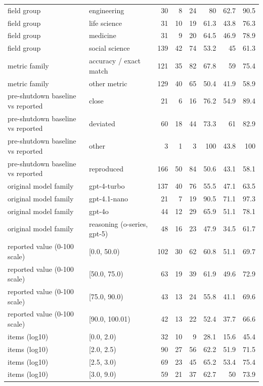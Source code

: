 \begin{longtable}{>{\raggedright\arraybackslash}p{20mm}>{\raggedright\arraybackslash}p{28mm}rrrrrr}
field group & engineering & 30 & 8 & 24 & 80 & 62.7 & 90.5 \\
field group & life science & 31 & 10 & 19 & 61.3 & 43.8 & 76.3 \\
field group & medicine & 31 & 9 & 20 & 64.5 & 46.9 & 78.9 \\
field group & social science & 139 & 42 & 74 & 53.2 & 45 & 61.3 \\
metric family & accuracy /\allowbreak{} exact match & 121 & 35 & 82 & 67.8 & 59 & 75.4 \\
metric family & other metric & 129 & 40 & 65 & 50.4 & 41.9 & 58.9 \\
pre-\allowbreak{}shutdown baseline vs reported & close & 21 & 6 & 16 & 76.2 & 54.9 & 89.4 \\
pre-\allowbreak{}shutdown baseline vs reported & deviated & 60 & 18 & 44 & 73.3 & 61 & 82.9 \\
pre-\allowbreak{}shutdown baseline vs reported & other & 3 & 1 & 3 & 100 & 43.8 & 100 \\
pre-\allowbreak{}shutdown baseline vs reported & reproduced & 166 & 50 & 84 & 50.6 & 43.1 & 58.1 \\
original model family & gpt-\allowbreak{}4-\allowbreak{}turbo & 137 & 40 & 76 & 55.5 & 47.1 & 63.5 \\
original model family & gpt-\allowbreak{}4.1-\allowbreak{}nano & 21 & 7 & 19 & 90.5 & 71.1 & 97.3 \\
original model family & gpt-\allowbreak{}4o & 44 & 12 & 29 & 65.9 & 51.1 & 78.1 \\
original model family & reasoning (o-\allowbreak{}series, gpt-\allowbreak{}5) & 48 & 16 & 23 & 47.9 & 34.5 & 61.7 \\
reported value (0-\allowbreak{}100 scale) & [0.0, 50.0) & 102 & 30 & 62 & 60.8 & 51.1 & 69.7 \\
reported value (0-\allowbreak{}100 scale) & [50.0, 75.0) & 63 & 19 & 39 & 61.9 & 49.6 & 72.9 \\
reported value (0-\allowbreak{}100 scale) & [75.0, 90.0) & 43 & 13 & 24 & 55.8 & 41.1 & 69.6 \\
reported value (0-\allowbreak{}100 scale) & [90.0, 100.01) & 42 & 13 & 22 & 52.4 & 37.7 & 66.6 \\
items (log10) & [0.0, 2.0) & 32 & 10 & 9 & 28.1 & 15.6 & 45.4 \\
items (log10) & [2.0, 2.5) & 90 & 27 & 56 & 62.2 & 51.9 & 71.5 \\
items (log10) & [2.5, 3.0) & 69 & 23 & 45 & 65.2 & 53.4 & 75.4 \\
items (log10) & [3.0, 9.0) & 59 & 21 & 37 & 62.7 & 50 & 73.9 \\
\end{longtable}
\endgroup

